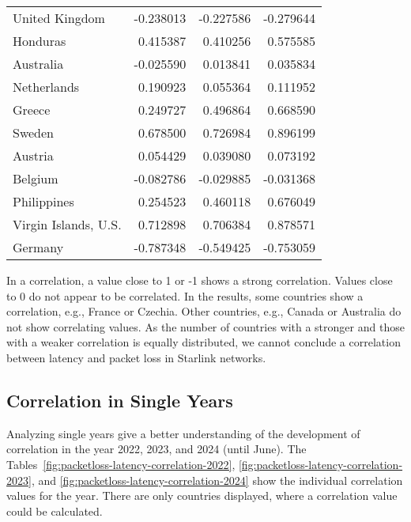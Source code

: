 \begin{table}[ht]
\begin{tabular}{lrrr}
		United Kingdom              & -0.238013   & -0.227586   & -0.279644   \\
		Honduras                    & 0.415387    & 0.410256    & 0.575585    \\
		Australia                   & -0.025590   & 0.013841    & 0.035834    \\
		Netherlands                 & 0.190923    & 0.055364    & 0.111952    \\
		Greece                      & 0.249727    & 0.496864    & 0.668590    \\
		Sweden                      & 0.678500    & 0.726984    & 0.896199    \\
		Austria                     & 0.054429    & 0.039080    & 0.073192    \\
		Belgium                     & -0.082786   & -0.029885   & -0.031368   \\
		Philippines                 & 0.254523    & 0.460118    & 0.676049    \\
		Virgin Islands, U.S.        & 0.712898    & 0.706384    & 0.878571    \\
		Germany                     & -0.787348   & -0.549425   & -0.753059   \\
		\bottomrule
	\end{tabular}
\end{table}

In a correlation, a value close to 1 or -1 shows a strong correlation. Values
close to 0 do not appear to be correlated. In the results, some countries show
a correlation, e.g., France or Czechia. Other countries, e.g., Canada or
Australia do not show correlating values. As the number of countries with a
stronger and those with a weaker correlation is equally distributed, we cannot
conclude a correlation between latency and packet loss in Starlink networks.

\subsection*{Correlation in Single Years}

Analyzing single years give a better understanding of the development of
correlation in the year 2022, 2023, and 2024 (until June). The
Tables~\ref{fig:packetloss-latency-correlation-2022},
\ref{fig:packetloss-latency-correlation-2023}, and
\ref{fig:packetloss-latency-correlation-2024} show the individual correlation
values for the year. There are only countries displayed, where a correlation
value could be calculated.

